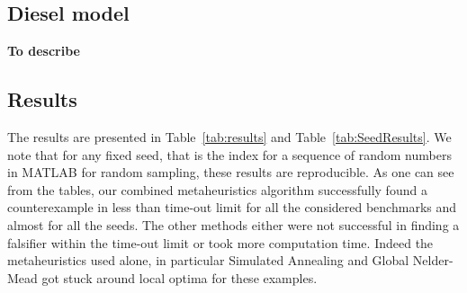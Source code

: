 




\subsection{Diesel model} \label{sec:diesel} {\bf To describe}

\subsection{Results} 
The results are presented in Table~\ref{tab:results} and Table~\ref{tab:SeedResults}.  We note that for
any fixed seed, that is the index for a sequence of random numbers in MATLAB for random sampling, these results are reproducible. 
As one can see from the tables, our combined metaheuristics algorithm successfully found a counterexample in
less than time-out limit for all the considered benchmarks and almost for all the seeds. 
The other methods either were not successful in finding a falsifier within the time-out limit or 
took more computation time. Indeed the metaheuristics used alone, in particular Simulated Annealing 
and Global Nelder-Mead got stuck around local optima for these examples.


